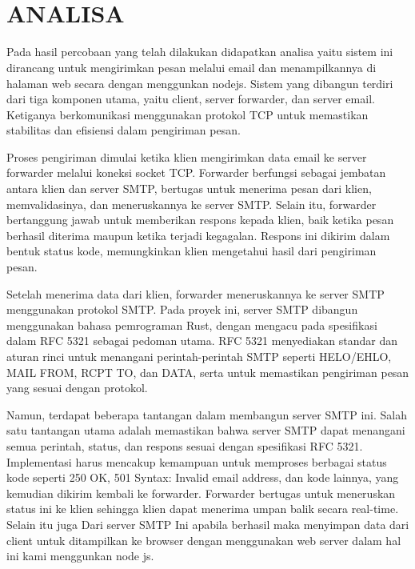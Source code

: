 \documentclass[12pt, a4paper]{article}
\begin{document}
\section{\centering\\ANALISA}
\quad\quad Pada hasil percobaan yang telah dilakukan didapatkan analisa yaitu sistem ini dirancang untuk mengirimkan pesan melalui email dan menampilkannya di halaman web secara dengan menggunkan nodejs. Sistem yang dibangun terdiri dari tiga komponen utama, yaitu client, server forwarder, dan server email. Ketiganya berkomunikasi menggunakan protokol TCP untuk memastikan stabilitas dan efisiensi dalam pengiriman pesan.

Proses pengiriman dimulai ketika klien mengirimkan data email ke server forwarder melalui koneksi socket TCP. Forwarder berfungsi sebagai jembatan antara klien dan server SMTP, bertugas untuk menerima pesan dari klien, memvalidasinya, dan meneruskannya ke server SMTP. Selain itu, forwarder bertanggung jawab untuk memberikan respons kepada klien, baik ketika pesan berhasil diterima maupun ketika terjadi kegagalan. Respons ini dikirim dalam bentuk status kode, memungkinkan klien mengetahui hasil dari pengiriman pesan.

Setelah menerima data dari klien, forwarder meneruskannya ke server SMTP menggunakan protokol SMTP. Pada proyek ini, server SMTP dibangun menggunakan bahasa pemrograman Rust, dengan mengacu pada spesifikasi dalam RFC 5321 sebagai pedoman utama. RFC 5321 menyediakan standar dan aturan rinci untuk menangani perintah-perintah SMTP seperti HELO/EHLO, MAIL FROM, RCPT TO, dan DATA, serta untuk memastikan pengiriman pesan yang sesuai dengan protokol.

Namun, terdapat beberapa tantangan dalam membangun server SMTP ini. Salah satu tantangan utama adalah memastikan bahwa server SMTP dapat menangani semua perintah, status, dan respons sesuai dengan spesifikasi RFC 5321. Implementasi harus mencakup kemampuan untuk memproses berbagai status kode seperti 250 OK, 501 Syntax: Invalid email address, dan kode lainnya, yang kemudian dikirim kembali ke forwarder. Forwarder bertugas untuk meneruskan status ini ke klien sehingga klien dapat menerima umpan balik secara real-time. Selain itu juga Dari server SMTP Ini apabila berhasil maka menyimpan data dari client untuk ditampilkan ke browser dengan menggunakan web server dalam hal ini kami menggunkan node js.
\begin{adjustwidth}{1.4cm}{0cm}
\quad\quad 
\end{adjustwidth}
\end{document}
